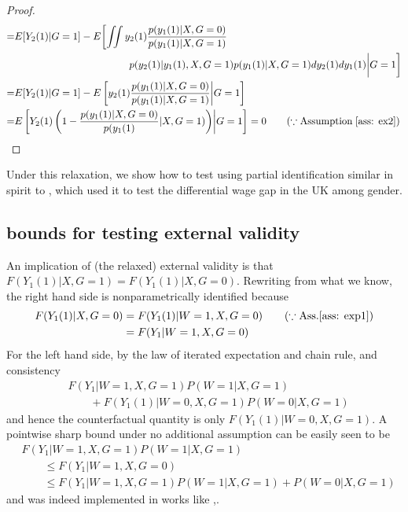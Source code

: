 \documentclass{article}
\begin{document}
\begin{proof}
\begin{align*}
    =& E[ Y_2(1) | G=1] - E\biggl[ \iint y_2(1) \frac{ p( y_1(1) | X, G=0)}{ p( y_1(1) | X, G=1) }\\
    &\hspace{4cm} p(y_2(1) | y_1(1), X, G=1) p( y_1(1) | X, G=1) dy_2(1) dy_1(1) \bigg| G=1\biggr]\\
    =&E[ Y_2(1) | G=1] - E\Square{ y_2(1) \frac{ p( y_1(1) | X, G=0)}{ p( y_1(1) | X, G=1) } \middle| G=1} \\
    =& E\Square{ Y_2(1)\paren{ 1 - \frac{ p( y_1(1) | X, G=0)}{ p( y_1(1)} | X, G=1) } \middle| G=1}
    = 0 \qquad( \because \text{Assumption}\; \ref{ass: ex2} )
    \end{align*}
\end{proof}


Under this relaxation, we show how to test using partial identification similar in spirit to \cite{blundell2007changes}, which used it to test the differential wage gap in the UK among gender.
\subsection{  bounds for testing external validity}
\label{sec:uniform bound 1}
An implication of (the relaxed) external validity is that $ F(Y_1(1) | X, G=1) = F(Y_1(1) | X, G=0) $. Rewriting from what we know, the right hand side is nonparametrically identified because  
\begin{align}
    F(Y_1(1) | X, G=0) &= F(Y_1(1) | W=1, X, G=0 ) \qquad(\because \text{Ass.} \ref{ass: exp1} )\\
    &= F(Y_1| W=1, X, G=0)
\end{align}
For the left hand side, by the law of iterated expectation and chain rule, and consistency
\begin{align}
    &F(Y_1 | W=1,X,G=1) P(W=1 | X, G=1) \\
    &\hspace{2em}+ F(Y_1(1) | W=0 , X, G=1)  P(W=0 | X, G=1)
\end{align}%
and hence the counterfactual quantity is only $F(Y_1(1) | W=0, X, G=1) $.
A pointwise sharp bound under no additional assumption can be easily seen to be 
\begin{align}
    &F(Y_1 | W=1,X,G=1) P(W=1| X, G=1) \\
    &\hspace{2em}\leq F(Y_1| W=1, X, G=0) \\ 
    &\hspace{2em}\leq F(Y_1 | W=1,X,G=1) P(W=1 | X, G=1) + P(W=0 | X, G=1)
\end{align}
and was indeed implemented in works like \cite{blundell2007changes},\cite{manski2009identification}.
\end{document}
